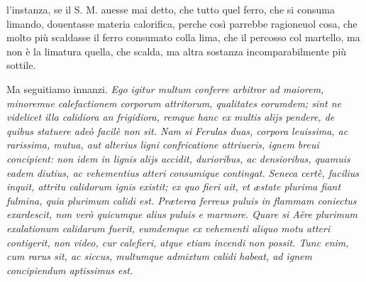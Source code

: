 \documentclass[11pt,twoside,openany]{book}
\begin{document}
l'instanza, se il S. M. auesse mai detto, che tutto quel ferro, che si consuma limando, douentasse materia calorifica, perche così parrebbe ragioneuol cosa, che molto più scaldasse il ferro consumato colla lima, che il percosso col martello, ma non è la limatura quella, che scalda, ma altra sostanza incomparabilmente più sottile.



\par\bigskip\noindent{}\enspace Ma seguitiamo innanzi. \textit{Ego igitur multum conferre arbitror ad maiorem, minoremue calefactionem corporum attritorum, qualitates eorumdem; sint ne videlicet illa calidiora an frigidiora, remque hanc ex multis alijs pendere, de quibus statuere adeò facilè non sit. Nam si Ferulas duas, corpora leuissima, ac rarissima, mutua, aut alterius ligni confricatione attriueris, ignem breui concipient: non idem in lignis alijs accidit, durioribus, ac densioribus, quamuis eadem diutius, ac vehementius atteri consumique contingat. }\textit{Seneca certè, facilius inquit, attritu calidorum ignis existit; ex quo fieri ait, vt æstate plurima fiant fulmina, quia plurimum calidi est. Præterea ferreus puluis in flammam coniectus exardescit, non verò quicumque alius puluis e marmore. Quare si Aëre plurimum exalationum calidarum fuerit, eumdemque ex vehementi aliquo motu atteri }\textit{contigerit, non video, cur calefieri, atque etiam incendi non possit. Tunc enim, cum rarus sit, ac siccus, multumque admixtum calidi habeat, ad ignem concipiendum aptissimus est.}
\end{document}
